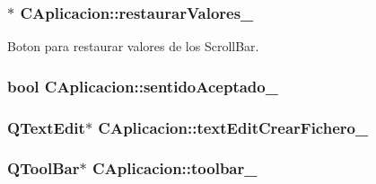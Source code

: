 \subsubsection[{\texorpdfstring{restaurar\+Valores\+\_\+}{restaurarValores_}}]{$\ast$ C\+Aplicacion\+::restaurar\+Valores\+\_\+\hspace{0.3cm}{\ttfamily [private]}}\hypertarget{classCAplicacion_acfcf9adb74829feabd09e7a8d495c622}{}\label{classCAplicacion_acfcf9adb74829feabd09e7a8d495c622}


Boton para restaurar valores de los Scroll\+Bar. 

\subsubsection[{\texorpdfstring{sentido\+Aceptado\+\_\+}{sentidoAceptado_}}]{\setlength{\rightskip}{0pt plus 5cm}bool C\+Aplicacion\+::sentido\+Aceptado\+\_\+\hspace{0.3cm}{\ttfamily [private]}}\hypertarget{classCAplicacion_a84891ee9944902c6c72827cabf65b06b}{}\label{classCAplicacion_a84891ee9944902c6c72827cabf65b06b}
\subsubsection[{\texorpdfstring{text\+Edit\+Crear\+Fichero\+\_\+}{textEditCrearFichero_}}]{\setlength{\rightskip}{0pt plus 5cm}Q\+Text\+Edit$\ast$ C\+Aplicacion\+::text\+Edit\+Crear\+Fichero\+\_\+\hspace{0.3cm}{\ttfamily [private]}}\hypertarget{classCAplicacion_a7008254b5b6afad5cea2347df2d6c191}{}\label{classCAplicacion_a7008254b5b6afad5cea2347df2d6c191}
\subsubsection[{\texorpdfstring{toolbar\+\_\+}{toolbar_}}]{\setlength{\rightskip}{0pt plus 5cm}Q\+Tool\+Bar$\ast$ C\+Aplicacion\+::toolbar\+\_\+\hspace{0.3cm}{\ttfamily [private]}}\hypertarget{classCAplicacion_a2dca58bda4c34c0f76d8c95fcbba064c}{}\label{classCAplicacion_a2dca58bda4c34c0f76d8c95fcbba064c}


